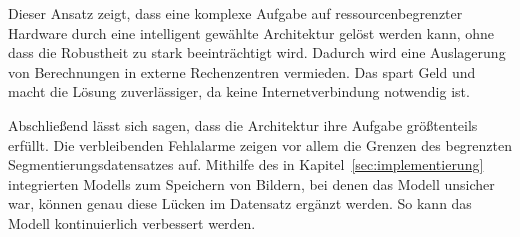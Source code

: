 Dieser Ansatz zeigt, dass eine komplexe Aufgabe auf ressourcenbegrenzter Hardware durch eine intelligent gewählte Architektur gelöst werden kann, ohne dass die Robustheit zu stark beeinträchtigt wird. Dadurch wird eine Auslagerung von Berechnungen in externe Rechenzentren vermieden. Das spart Geld und macht die Lösung zuverlässiger, da keine Internetverbindung notwendig ist.

Abschließend lässt sich sagen, dass die Architektur ihre Aufgabe größtenteils erfüllt. Die verbleibenden Fehlalarme zeigen vor allem die Grenzen des begrenzten Segmentierungsdatensatzes auf. Mithilfe des in Kapitel~\ref{sec:implementierung} integrierten Modells zum Speichern von Bildern, bei denen das Modell unsicher war, können genau diese Lücken im Datensatz ergänzt werden. So kann das Modell kontinuierlich verbessert werden.
